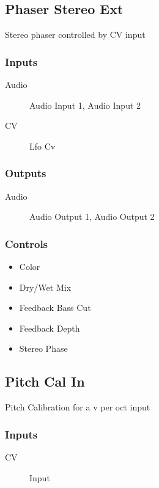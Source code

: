\subsection{Phaser Stereo Ext}

Stereo phaser controlled by CV input



\subsubsection{Inputs}
\begin{description}
\item [Audio] Audio Input 1, Audio Input 2
\item [CV] Lfo Cv
\end{description}

\subsubsection{Outputs}
\begin{description}
\item [Audio] Audio Output 1, Audio Output 2
\end{description}

\subsubsection{Controls}
\begin{itemize}
\item Color
\item Dry/Wet Mix
\item Feedback Bass Cut
\item Feedback Depth
\item Stereo Phase
\end{itemize}

\subsection{Pitch Cal In}

Pitch Calibration for a v per oct input



\subsubsection{Inputs}
\begin{description}
\item [CV] Input
\end{description}

